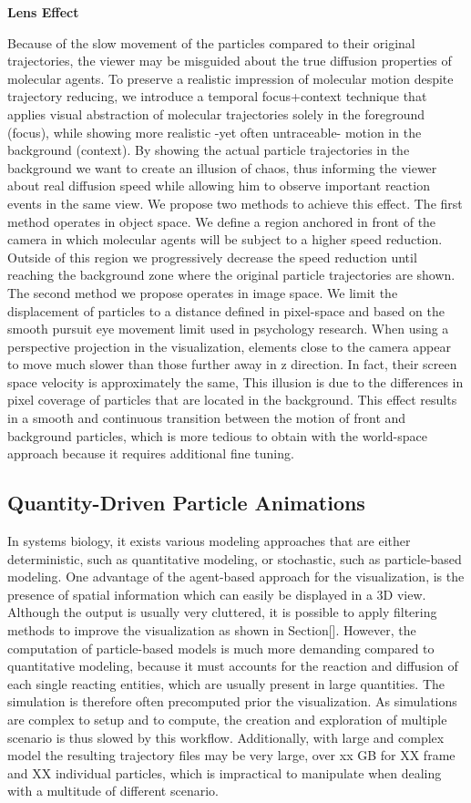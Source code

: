 \textbf{Lens Effect}

Because of the slow movement of the particles compared to their original trajectories, the viewer may be misguided about the true diffusion properties of molecular agents.
To preserve a realistic impression of molecular motion despite trajectory reducing, we introduce a temporal focus+context technique that applies visual abstraction of molecular trajectories solely in the foreground (focus), while showing more realistic -yet often untraceable- motion in the background (context).
By showing the actual particle trajectories in the background we want to create an illusion of chaos, thus informing the viewer about real diffusion speed while allowing him to observe important reaction events in the same view.
We propose two methods to achieve this effect.
The first method operates in object space.
We define a region anchored in front of the camera in which molecular agents will be subject to a higher speed reduction.
Outside of this region we progressively decrease the speed reduction until reaching the background zone where the original particle trajectories are shown.
The second method we propose operates in image space.
We limit the displacement of particles to a distance defined in pixel-space and based on the smooth pursuit eye movement limit used in psychology research.
When using a perspective projection in the visualization, elements close to the camera appear to move much slower than those further away in z direction. 
In fact, their screen space velocity is approximately the same, This illusion is due to the differences in pixel coverage of particles that are located in the background.
This effect results in a smooth and continuous transition between the motion of front and background particles, which is more tedious to obtain with the world-space approach because it requires additional fine tuning.

\subsection{Quantity-Driven Particle Animations}

In systems biology, it exists various modeling approaches that are either deterministic, such as quantitative modeling, or stochastic, such as particle-based modeling.
One advantage of the agent-based approach for the visualization, is the presence of spatial information which can easily be displayed in a 3D view.
Although the output is usually very cluttered, it is possible to apply filtering methods to improve the visualization as shown in Section[].
However, the computation of particle-based models is much more demanding compared to quantitative modeling, because it must accounts for the reaction and diffusion of each single reacting entities, which are usually present in large quantities.
The simulation is therefore often precomputed prior the visualization.
As simulations are complex to setup and to compute, the creation and exploration of multiple scenario is thus slowed by this workflow.
Additionally, with large and complex model the resulting trajectory files may be very large, over xx GB for XX frame and XX individual particles, which is impractical to manipulate when dealing with a multitude of different scenario.

